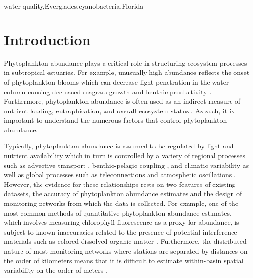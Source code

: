 \documentclass[review]{elsarticle}
\begin{document}
\begin{frontmatter}
\begin{abstract}
  \end{abstract}
  
  \begin{keyword}
  water quality\sep Everglades\sep cyanobacteria\sep Florida
  \end{keyword}
  
  \end{frontmatter}
  
  \linenumbers
  
  \section{Introduction}
  
Phytoplankton abundance plays a critical role in structuring ecosystem processes in subtropical estuaries. For example, unusually high abundance reflects the onset of phytoplankton blooms which can decrease light penetration in the water column causing decreased seagrass growth and benthic productivity \citep{kelble_2005}. Furthermore, phytoplankton abundance is often used as an indirect measure of nutrient loading, eutrophication, and overall ecosystem status \citep{boyer_2009}. As such, it is important to understand the numerous factors that control phytoplankton abundance. 

Typically, phytoplankton abundance is assumed to be regulated by light and nutrient availability which in turn is controlled by a variety of regional processes such as advective transport \citep{dugdale2012river}, benthic-pelagic coupling \citep{zhang_2014,lawrence2004wind}, and climatic variability as well as global processes such as teleconnections and atmospheric oscillations \citep{briceno_climatic_2009}. However, the evidence for these relationships rests on two features of existing datasets, the accuracy of phytoplankton abundance estimates and the design of monitoring networks from which the data is collected. For example, one of the most common methods of quantitative phytoplankton abundance estimates, which involves measuring chlorophyll fluorescence as a proxy for abundance, is subject to known inaccuracies related to the presence of potential interference materials such as colored dissolved organic matter \citep{goldman2013estimation}. Furthermore, the distributed nature of most monitoring networks where stations are separated by distances on the order of kilometers means that it is difficult to estimate within-basin spatial variability on the order of meters \citep{anttila2008feasible}. 
\end{document}
